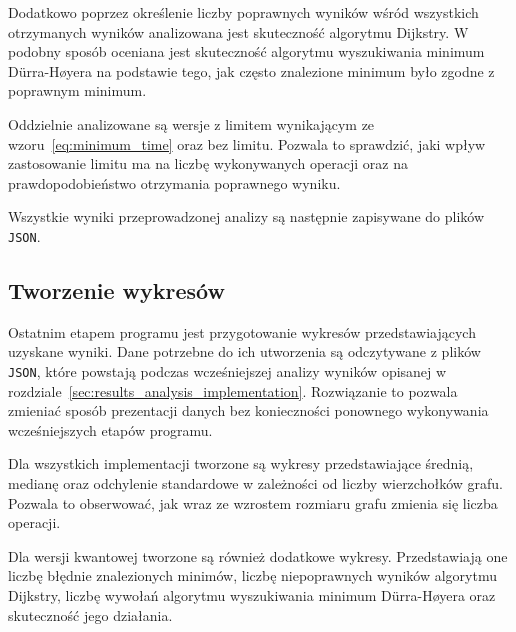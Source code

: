 Dodatkowo poprzez określenie liczby poprawnych wyników wśród wszystkich otrzymanych wyników analizowana jest skuteczność algorytmu Dijkstry. W podobny sposób oceniana jest skuteczność algorytmu wyszukiwania minimum Dürra-Høyera na podstawie tego, jak często znalezione minimum było zgodne z poprawnym minimum.

Oddzielnie analizowane są wersje z limitem wynikającym ze wzoru~\eqref{eq:minimum_time} oraz bez limitu. Pozwala to sprawdzić, jaki wpływ zastosowanie limitu ma na liczbę wykonywanych operacji oraz na prawdopodobieństwo otrzymania poprawnego wyniku.

Wszystkie wyniki przeprowadzonej analizy są następnie zapisywane do plików \texttt{JSON}.
\newpage

\subsection{Tworzenie wykresów}
\label{subsec:plots_implementation}

Ostatnim etapem programu jest przygotowanie wykresów przedstawiających uzyskane wyniki. Dane potrzebne do ich utworzenia są odczytywane z plików  \texttt{JSON}, które powstają podczas wcześniejszej analizy wyników opisanej w rozdziale~\ref{sec:results_analysis_implementation}. Rozwiązanie to pozwala zmieniać sposób prezentacji danych bez konieczności ponownego wykonywania wcześniejszych etapów programu.

Dla wszystkich implementacji tworzone są wykresy przedstawiające średnią, medianę oraz odchylenie standardowe w zależności od liczby wierzchołków grafu. Pozwala to obserwować, jak wraz ze wzrostem rozmiaru grafu zmienia się liczba operacji.

Dla wersji kwantowej tworzone są również dodatkowe wykresy. Przedstawiają one liczbę błędnie znalezionych minimów, liczbę niepoprawnych wyników algorytmu Dijkstry, liczbę wywołań algorytmu wyszukiwania minimum Dürra-Høyera oraz skuteczność jego działania.






